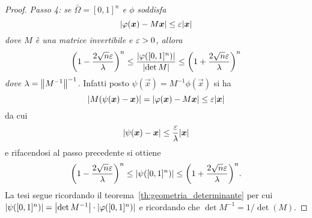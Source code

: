 \begin{proof}
\emph{Passo 4: se $\bar \Omega=[0,1]^n$ e $\phi$ soddisfa 
\begin{equation}\label{eq:49924}
  {\left|\varphi(\boldsymbol x) - M\boldsymbol x\right|} \le \varepsilon {\left|\boldsymbol x\right|}
\end{equation}
dove $M$ è una matrice invertibile e $\varepsilon>0$, allora 
\[
    {\left( 1-\frac{2\sqrt n \varepsilon}\lambda \right)}^n
    \le \frac{{\left|\varphi([0,1]^n)\right|}}{{\left|\det M\right|}} 
    \le {\left( 1+\frac{2\sqrt n \varepsilon}\lambda \right)}^n
\]
dove $\lambda = {\left\Vert M^{-1}\right\Vert}^{-1}$.
}
Infatti posto $\psi(\vec x) = M^{-1}\phi(\vec x)$
si ha 
\[
  {\left|M(\psi(\boldsymbol x)-\boldsymbol x)\right|} = {\left|\varphi(\boldsymbol x) - M\boldsymbol x\right|} 
    \le \varepsilon{\left|\boldsymbol x\right|}
\]
da cui 
\[
  {\left|\psi(\boldsymbol x) - \boldsymbol x\right|} \le \frac{\varepsilon}{\lambda} {\left|\boldsymbol x\right|}
\]
e rifacendosi al passo precedente si ottiene 
\[
  {\left( 1-\frac{2\sqrt n\varepsilon}{\lambda} \right)}^n
  \le {\left|\psi([0,1]^n)\right|} 
  \le {\left( 1+\frac{2\sqrt n\varepsilon}{\lambda} \right)}^n.
\]
La tesi segue ricordando il teorema~\ref{th:geometria_determinante}
per cui ${\left|\psi([0,1]^n)\right|} = {\left|\det M^{-1}\right|} \cdot {\left|\varphi([0,1]^n)\right|}$
e ricordando che $\det M^{-1}= 1/\det(M)$.


\end{proof}
